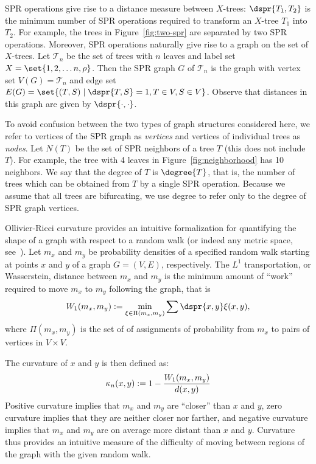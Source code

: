 \documentclass[11pt,onecolumn,conference]{IEEEtran}
\newcommand{\curvature}[2][]{%
    \ifthenelse{\equal{#1}{}}%
		{\kappa_n(#2)}%
		{\kappa_n(#1;#2)}%
}
\begin{document}
SPR operations give rise to a distance measure between $X$-trees: $\dspr{T_1, T_2}$ is the minimum number of SPR operations required to transform an $X$-tree $T_1$ into $T_2$.
For example, the trees in Figure~\ref{fig:two-spr} are separated by two SPR operations.
Moreover, SPR operations naturally give rise to a graph on the set of $X$-trees.
Let $\mathcal{T}_n$ be the set of trees with $n$ leaves and label set $X = \set{1, 2, \ldots n, \rho}$.
Then the SPR graph $G$ of $\mathcal{T}_n$ is the graph with vertex set $V(G) = \mathcal{T}_n$ and edge set $E(G) = \set{(T,S) \mid \dspr{T,S} = 1, T \in V, S \in V}$.
Observe that distances in this graph are given by $\dspr{\cdot,\cdot}$.

To avoid confusion between the two types of graph structures considered here, we refer to vertices of the SPR graph as \emph{vertices} and vertices of individual trees as \emph{nodes}.
Let $N(T)$ be the set of SPR neighbors of a tree $T$ (this does not include $T$).
For example, the tree with 4 leaves in Figure~\ref{fig:neighborhood} has 10 neighbors.
We say that the degree of $T$ is $\degree{T}$, that is, the number of trees which can be obtained from $T$ by a single SPR operation.
Because we assume that all trees are bifurcating, we use degree to refer only to the degree of SPR graph vertices.

Ollivier-Ricci curvature provides an intuitive formalization for quantifying the shape of a graph with respect to a random walk (or indeed any metric space, see~\cite{Ollivier2009-bw}).
Let $m_x$ and $m_y$ be probability densities of a specified random walk starting at points $x$ and $y$ of a graph $G = (V,E)$, respectively.
The $L^1$ transportation, or Wasserstein, distance between $m_x$ and $m_y$ is the minimum amount of ``work'' required to move $m_x$ to $m_y$ following the graph, that is
 $$ W_1(m_x, m_y) := \min_{\xi \in \Pi(m_x, m_y)} \sum \dspr{x,y} \xi(x,y),$$
where $\Pi(m_x, m_y)$ is the set of of assignments of probability from $m_x$ to pairs of vertices in $V \times V$. 

The curvature of $x$ and $y$ is then defined as:
\begin{equation}
\curvature{x, y} := 1 - \frac{W_1(m_x, m_y)}{d(x, y)}
\label{eq:curvatureDef}
\end{equation}
Positive curvature implies that $m_x$ and $m_y$ are ``closer'' than $x$ and $y$, zero curvature implies that they are neither closer nor farther, and negative curvature implies that $m_x$ and $m_y$ are on average more distant than $x$ and $y$.
Curvature thus provides an intuitive measure of the difficulty of moving between regions of the graph with the given random walk.
\end{document}

